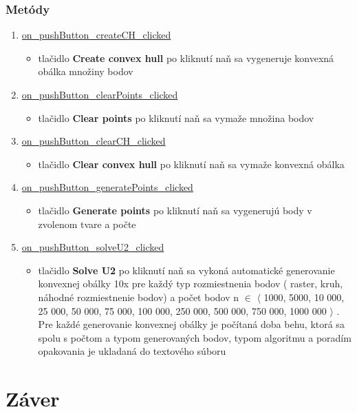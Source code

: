 \documentclass[12pt]{article}
\begin{document}
\subsubsection{Metódy}
\begin{enumerate}
\item[] \underline{on\_pushButton\_createCH\_clicked}
\begin{itemize}
\item tlačidlo \textbf{Create convex hull} po kliknutí naň sa vygeneruje konvexná obálka množiny bodov
\end{itemize}

\item[] \underline{on\_pushButton\_clearPoints\_clicked}
\begin{itemize}
\item tlačidlo \textbf{Clear points}  po kliknutí naň sa vymaže množina bodov
\end{itemize}

\item[] \underline{on\_pushButton\_clearCH\_clicked}
\begin{itemize}
\item tlačidlo \textbf{Clear convex hull}  po kliknutí naň sa vymaže konvexná obálka
\end{itemize}

\item[] \underline{on\_pushButton\_generatePoints\_clicked}
\begin{itemize}
\item tlačidlo \textbf{Generate points}  po kliknutí naň sa vygenerujú body v zvolenom tvare a počte
\end{itemize}

\item[] \underline{on\_pushButton\_solveU2\_clicked}
\begin{itemize}
\item tlačidlo \textbf{Solve U2}  po kliknutí naň sa vykoná automatické generovanie konvexnej obálky 10x pre každý typ rozmiestnenia bodov ( raster, kruh, náhodné rozmiestnenie bodov) a počet bodov n $\in$ $\langle$ 1000, 5000, 10 000, 25 000, 50 000, 75 000, 100 000, 250 000, 500 000, 750 000, 1000 000 $\rangle$ . Pre každé generovanie konvexnej obálky je počítaná doba behu, ktorá sa spolu s počtom a typom generovaných bodov, typom algoritmu a poradím opakovania je ukladaná do textového súboru
\end{itemize}

\end{enumerate}

\clearpage
\section{Záver}

\nocite{*}
{}

    
\end{document}
